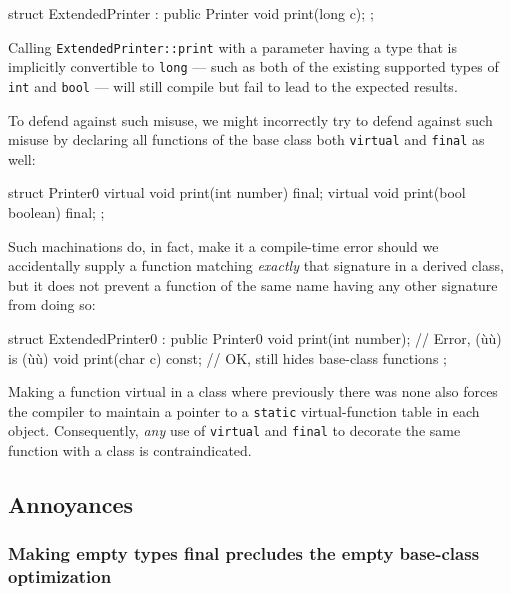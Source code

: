 {\begin{emcppslisting}[emcppsbatch=e9]
struct ExtendedPrinter : public Printer
{
    void print(long c);
};
\end{emcppslisting}
    

\noindent Calling \lstinline!ExtendedPrinter::print! with a parameter having a type
that is implicitly convertible to \lstinline!long! --- such as both of the
existing supported types of \lstinline!int! and \lstinline!bool! --- will
still compile but fail to lead to the expected results.

To defend against such misuse, we might incorrectly try to defend
against such misuse by declaring all functions of the base class both
\lstinline!virtual! and \lstinline!final! as well:

\begin{emcppslisting}[emcppsbatch=e10]
struct Printer0
{
    virtual void print(int number) final;
    virtual void print(bool boolean) final;
};
\end{emcppslisting}
    
\enlargethispage*{2ex}%
\noindent Such machinations do, in fact, make it a compile-time error should we
accidentally supply a function matching \emph{exactly} that signature in
a derived class, but it does not prevent a function of the same name
having any other signature from doing so:

\begin{emcppslisting}[emcppsbatch=e10]
struct ExtendedPrinter0 : public Printer0
{
    void print(int number);    // Error, (ù{}ù) is (ù{}ù)
    void print(char c) const;  // OK, still hides base-class functions
};
\end{emcppslisting}
    

\noindent Making a function virtual in a class where previously there was none
also forces the compiler to maintain a pointer to a \lstinline!static!
virtual-function table in each object. Consequently, \emph{any} use of
\lstinline!virtual! and \lstinline!final! to decorate the same function with a
class is contraindicated.

\subsection[Annoyances]{Annoyances}\label{annoyances-final}

\subsubsection[Making empty types \lstinline!final! precludes the empty base-class optimization]{Making empty types {\SubsubsecCode final} precludes the empty base-class optimization}\label{making-empty-types-final-precludes-the-empty-base-class-optimization}

}
